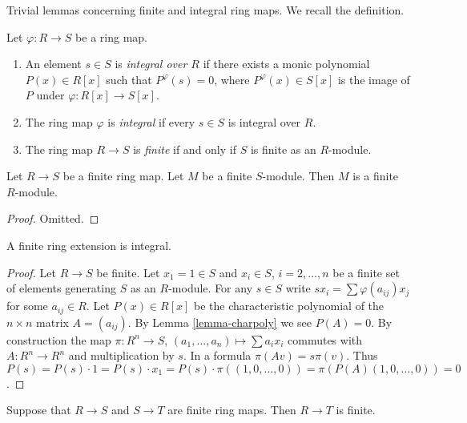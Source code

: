 \noindent
Trivial lemmas concerning finite and integral ring maps.
We recall the definition.

\begin{definition}
\label{definition-integral-ring-map}
Let $\varphi : R \to S$ be a ring map.
\begin{enumerate}
\item An element $s \in S$
is {\it integral over $R$} if there exists a monic
polynomial $P(x) \in R[x]$ such that
$P^\varphi(s) = 0$, where $P^\varphi(x) \in S[x]$
is the image of $P$ under $\varphi : R[x] \to S[x]$.
\item  The ring map $\varphi$ is {\it integral}
if every $s \in S$ is integral over $R$.
\item The ring map $R \to S$ is {\it finite} if and only
if $S$ is finite as an $R$-module.
\end{enumerate}
\end{definition}

\begin{lemma}
\label{lemma-finite-module-over-finite-extension}
Let $R \to S$ be a finite ring map.
Let $M$ be a finite $S$-module.
Then $M$ is a finite $R$-module.
\end{lemma}

\begin{proof}
Omitted.
\end{proof}

\begin{lemma}
\label{lemma-finite-is-integral}
A finite ring extension is integral.
\end{lemma}

\begin{proof}
Let $R \to S$ be finite. Let $x_1 = 1 \in S$ and
$x_i \in S$, $i = 2, \ldots, n$ be a finite set of
elements generating $S$ as an $R$-module.
For any $s\in S$ write $sx_i = \sum \varphi(a_{ij}) x_j$
for some $a_{ij} \in R$. Let $P(x) \in R[x]$ be
the characteristic polynomial of the $n\times n$ matrix
$A = (a_{ij})$. By Lemma \ref{lemma-charpoly} we see
$P(A) = 0$. By construction the map $\pi : R^n \to S$,
$(a_1, \ldots, a_n) \mapsto \sum a_i x_i$
commutes with $A : R^n \to R^n$ and
multiplication by $s$. In a formula
$\pi(Av) = s\pi(v)$. Thus $P(s) = P(s) \cdot 1
= P(s) \cdot x_1 = P(s) \cdot \pi((1, 0, \ldots, 0))
= \pi(P(A)(1, 0, \ldots, 0)) = 0$.
\end{proof}

\begin{lemma}
\label{lemma-finite-transitive}
Suppose that $R \to S$ and $S \to T$ are finite
ring maps. Then $R \to T$ is finite.
\end{lemma}

